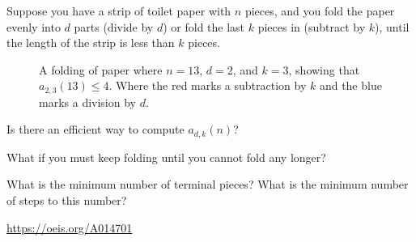 \documentclass{article}
\begin{document}
  Suppose you have a strip of toilet paper with $n$ pieces, and you fold the
  paper evenly into $d$ parts (divide by $d$) or fold the last $k$ pieces in
  (subtract by $k$), until the length of the strip is less than $k$ pieces.
\begin{figure}[!h]
  \centering
  \caption{
    A folding of paper where $n = 13$, $d = 2$, and $k = 3$, showing that
    $a_{2,3}(13) \leq 4$.
    Where the red marks a subtraction by $k$ and the blue marks a division by $d$.
  }
\end{figure}

\begin{question}
  Is there an efficient way to compute $a_{d,k}(n)$?
\end{question}

\begin{related}
  \item What if you must keep folding until you cannot fold any longer?
  \item What is the minimum number of terminal pieces? What is the minimum number of steps to this number?
\end{related}

\begin{references}
  \item \url{https://oeis.org/A014701}
\end{references}
\end{document}
